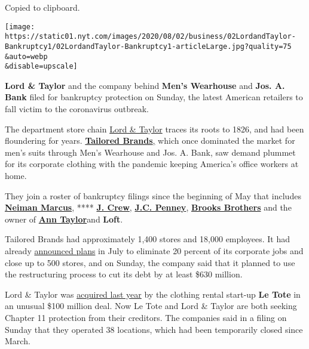 Copied to clipboard.

\texttt{[image: https://static01.nyt.com/images/2020/08/02/business/02LordandTaylor-Bankruptcy1/02LordandTaylor-Bankruptcy1-articleLarge.jpg?quality=75\\\&auto=webp\\\&disable=upscale]}

\textbf{Lord \& Taylor} and the company behind \textbf{Men's Wearhouse}
and \textbf{Jos. A. Bank} filed for bankruptcy protection on Sunday, the
latest American retailers to fall victim to the coronavirus outbreak.

The department store chain
\href{https://www.nytimes.com/2020/08/02/business/Lord-and-Taylor-Bankruptcy.html}{Lord
\& Taylor} traces its roots to 1826, and had been floundering for years.
\textbf{\href{https://www.nytimes.com/2020/08/03/business/tailored-brands-mens-wearhouse-bankruptcy.html}{Tailored
Brands}}\href{https://www.nytimes.com/2020/08/03/business/tailored-brands-mens-wearhouse-bankruptcy.html}{,}
which once dominated the market for men's suits through Men's Wearhouse
and Jos. A. Bank, saw demand plummet for its corporate clothing with the
pandemic keeping America's office workers at home.

They join a roster of bankruptcy filings since the beginning of May that
includes
\textbf{\href{https://www.nytimes.com/2020/05/07/business/neiman-marcus-bankruptcy.html}{Neiman
Marcus}}, ****
\textbf{\href{https://www.nytimes.com/2020/05/03/business/j-crew-bankruptcy-coronavirus.html}{J.
Crew}},
\textbf{\href{https://www.nytimes.com/2020/05/15/business/jc-penney-bankruptcy-coronavirus.html}{J.C.
Penney}},
\textbf{\href{https://www.nytimes.com/2020/07/08/business/brooks-brothers-chapter-11-bankruptcy.html}{Brooks
Brothers}} and the owner of
\textbf{\href{https://www.nytimes.com/2020/07/23/business/ascena-bankruptcy-ann-taylor-lane-bryant.html}{Ann
Taylor}}\href{https://www.nytimes.com/2020/07/23/business/ascena-bankruptcy-ann-taylor-lane-bryant.html}{}and
\textbf{Loft}.

Tailored Brands had approximately 1,400 stores and 18,000 employees. It
had already
\href{https://www.businesswire.com/news/home/20200721005319/en/Tailored-Brands-Announces-Plans-Reduce-Headcount-Close}{announced
plans} in July to eliminate 20 percent of its corporate jobs and close
up to 500 stores, and on Sunday, the company said that it planned to use
the restructuring process to cut its debt by at least \$630 million.

Lord \& Taylor was
\href{https://www.nytimes.com/2019/08/28/business/lord-taylor-sold-le-tote.html}{acquired
last year} by the clothing rental start-up \textbf{Le Tote} in an
unusual \$100 million deal. Now Le Tote and Lord \& Taylor are both
seeking Chapter 11 protection from their creditors. The companies said
in a filing on Sunday that they operated 38 locations, which had been
temporarily closed since March.

